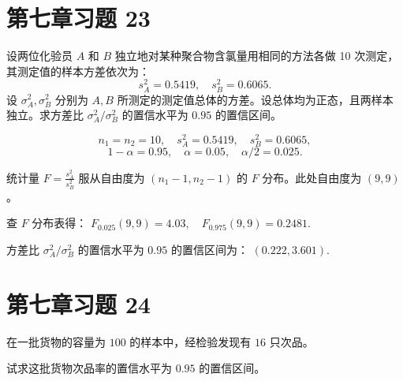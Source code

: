 \documentclass[twoside]{article}
\begin{document}
\section{第七章习题 23}


设两位化验员 $A$ 和 $B$ 独立地对某种聚合物含氯量用相同的方法各做 10 次测定，其测定值的样本方差依次为：
\[
s_A^2 = 0.5419, \quad s_B^2 = 0.6065.
\]
设 $\sigma_A^2, \sigma_B^2$ 分别为 $A, B$ 所测定的测定值总体的方差。设总体均为正态，且两样本独立。求方差比 $\sigma_A^2 / \sigma_B^2$ 的置信水平为 $0.95$ 的置信区间。


\begin{ans}{23}{23}
    \[
    n_1 = n_2 = 10, \quad s_A^2 = 0.5419, \quad s_B^2 = 0.6065,
    \]
    \[
    1 - \alpha = 0.95, \quad \alpha = 0.05, \quad \alpha/2 = 0.025.
    \]
    
    统计量
    \(
    F = \frac{s_A^2}{s_B^2}
    \)
    服从自由度为 $(n_1 - 1, n_2 - 1)$ 的 $F$ 分布。此处自由度为 $(9, 9)$。
    
    查 $F$ 分布表得：
    \(
    F_{0.025}(9, 9) = 4.03, \quad F_{0.975}(9, 9) = 0.2481.
    \)
    
    方差比 $\sigma_A^2 / \sigma_B^2$ 的置信水平为 $0.95$ 的置信区间为：
    \(
    (0.222, 3.601).
    \)

\end{ans}

\section{第七章习题 24}

在一批货物的容量为 $100$ 的样本中，经检验发现有 $16$ 只次品。

试求这批货物次品率的置信水平为 $0.95$ 的置信区间。
    
\end{document}

